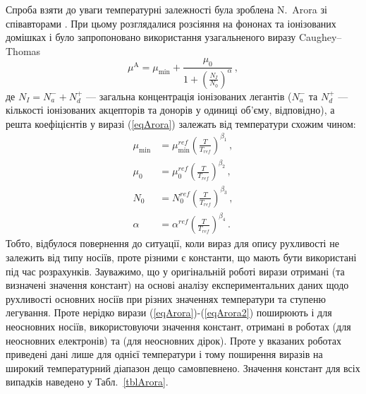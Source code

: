 \documentclass[12pt,a4paper,titlepage,oneside]{book}
\numberwithin{equation}{part}
\begin{document}
Спроба взяти до уваги температурні залежності була зроблена N.~Arora зі співавторами \cite{Arora1982}.
При цьому розглядалися розсіяння на фононах та  іонізованих домішках і було запропоновано використання узагальненого виразу Caughey--Thomas
\begin{equation}\label{eqArora}
  \mu^\mathrm{A}=\mu_\mathrm{min}+\frac{\mu_0}{1+\left(\frac{N_I}{N_0}\right)^\alpha}\,,
\end{equation}
де $N_I=N_a^-+N_d^+$ --- загальна концентрація іонізованих легантів
($N_a^-$ та $N_d^+$ --- кількості іонізованих акцепторів та донорів у одиниці об'єму, відповідно),
а решта коефіцієнтів у виразі (\ref{eqArora}) залежать від температури схожим чином:
\begin{equation}\label{eqArora2}
\begin{aligned}
    \mu_\mathrm{min} &=\mu_\mathrm{min}^{ref}\left(\frac{T}{T_{ref}}\right)^{\beta_1}\,, \\
   \mu_0 &=\mu_0^{ref}\left(\frac{T}{T_{ref}}\right)^{\beta_2}\,,\\
   N_0 &=N_0^{ref}\left(\frac{T}{T_{ref}}\right)^{\beta_3}\,,\\
   \alpha &=\alpha^{ref}\left(\frac{T}{T_{ref}}\right)^{\beta_4}\,.\
\end{aligned}
\end{equation}
Тобто, відбулося повернення до ситуації, коли вираз для опису рухливості не залежить від типу носіїв, проте
різними є константи, що мають бути використані під час розрахунків.
Зауважимо, що у оригінальній роботі \cite{Arora1982} вирази отримані (та визначені значення констант)
на основі аналізу експериментальних даних щодо рухливості основних носіїв при різних значеннях температури та ступеню легування.
Проте нерідко вирази (\ref{eqArora})-(\ref{eqArora2}) поширюють і для неосновних носіїв, використовуючи значення констант,
отримані в роботах \cite{Swirhun1986} (для неосновних електронів) та \cite{Alamo1985} (для неосновних дірок).
Проте у вказаних роботах приведені дані лише для однієї температури і тому поширення виразів на широкий температурний діапазон дещо самовпевнено.
Значення констант для всіх випадків наведено у Табл.~\ref{tblArora}.
\end{document}
